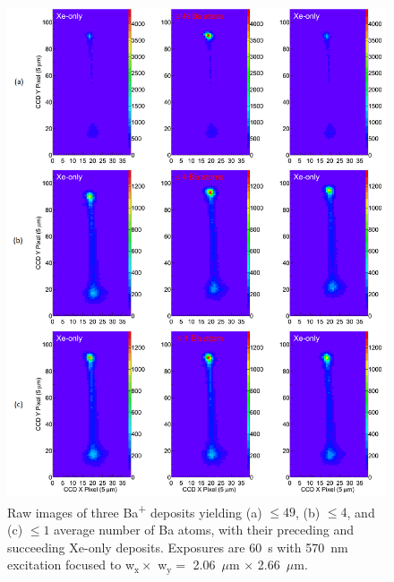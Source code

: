 \begin{figure} %
        \centering
                \includegraphics[width=.95\textwidth]{figures/xebaxe_average_scrunched.png}
                \caption{Raw images of three Ba\textsuperscript{+} deposits yielding (a) $\leq 49$, (b) $\leq 4$, and (c) $\leq 1$ average number of Ba atoms, with their preceding and succeeding Xe-only deposits.  Exposures are 60~s with 570~nm excitation focused to w$_{\text{x}} \times$ w$_{\text{y}} =$ 2.06~$\mu$m $\times$ 2.66~$\mu$m.}
\label{fig:xebaxe}
\end{figure}



